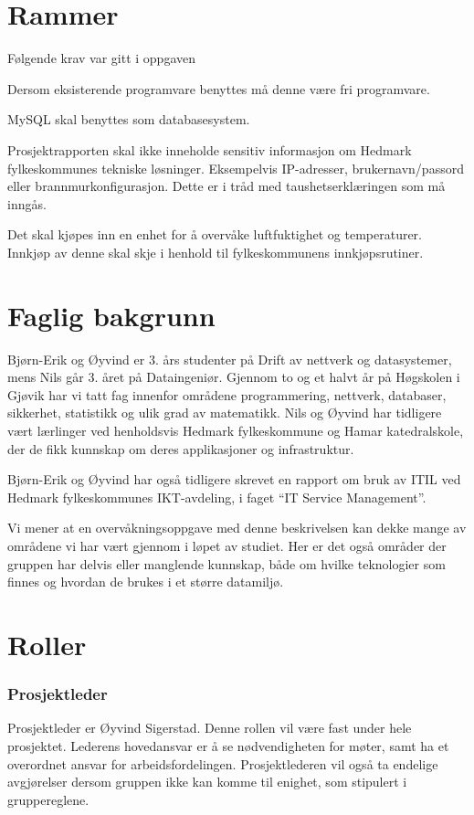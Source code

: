 \section{Rammer}
Følgende krav var gitt i oppgaven
\begin{itemize*}
	\item Dersom eksisterende programvare benyttes må denne være fri programvare.
	\item MySQL skal benyttes som databasesystem.
	\item Prosjektrapporten skal ikke inneholde sensitiv informasjon om Hedmark fylkeskommunes tekniske løsninger. Eksempelvis IP-adresser, brukernavn/passord eller brannmurkonfigurasjon. Dette er i tråd med taushetserklæringen som må inngås.
	\item Det skal kjøpes inn en enhet for å overvåke luftfuktighet og temperaturer. Innkjøp av denne skal skje i henhold til fylkeskommunens innkjøpsrutiner.
\end{itemize*}

\section{Faglig bakgrunn}
Bjørn-Erik og Øyvind er 3. års studenter på Drift av nettverk og datasystemer, mens Nils går 3. året på Dataingeniør. Gjennom to og et halvt år på Høgskolen i Gjøvik har vi tatt fag innenfor områdene programmering, nettverk, databaser, sikkerhet, statistikk og ulik grad av matematikk. Nils og Øyvind har tidligere vært lærlinger ved henholdsvis Hedmark fylkeskommune og Hamar katedralskole, der de fikk kunnskap om deres applikasjoner og infrastruktur.

Bjørn-Erik og Øyvind har også tidligere skrevet en rapport om bruk av ITIL ved Hedmark fylkeskommunes IKT-avdeling, i faget ``IT Service Management''.

Vi mener at en overvåkningsoppgave med denne beskrivelsen kan dekke mange av områdene vi har vært gjennom i løpet av studiet. Her er det også områder der gruppen har delvis eller manglende kunnskap, både om hvilke teknologier som finnes og hvordan de brukes i et større datamiljø.

\section{Roller}
\subsubsection{Prosjektleder}
Prosjektleder er Øyvind Sigerstad. Denne rollen vil være fast under hele prosjektet. Lederens hovedansvar er å se nødvendigheten for møter, samt ha et overordnet ansvar for arbeidsfordelingen. Prosjektlederen vil også ta endelige avgjørelser dersom gruppen ikke kan komme til enighet, som stipulert i gruppereglene.

